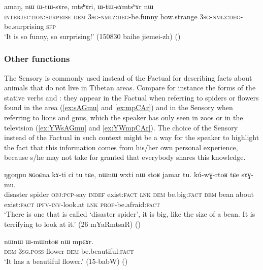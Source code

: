 \begin{exe}
\ex \label{ex:amang.WtWsAre}
 \gll amaŋ, nɯ ɯ-tɯ-sɤre, mtsʰɤri, ɯ-tɯ-sɤmtsʰɤr nɯ \\
 \textsc{interjection}:\textsc{surprise} \textsc{dem} \textsc{3sg}-\textsc{nmlz}:\textsc{deg}-be.funny  how.strange \textsc{3sg}-\textsc{nmlz}:\textsc{deg}-be.surprising \textsc{sfp} \\
 \glt `It is so funny, so surprising!' (150830 baihe jiemei-zh)
()
\end{exe}



\subsubsection{Other functions} \label{sec:sensory.other}
The Sensory is commonly used instead of the Factual for describing facts about animals that do not live in Tibetan areas. Compare for instance the forms of the stative verbs  and : they appear in the Factual when referring to spiders or flowers found in the area (\ref{ex:sAGmu} and \ref{ex:mpCAr}) and in the Sensory when referring to lions and gnus, which the speaker has only seen in zoos or in the television  (\ref{ex:YWsAGmu} and \ref{ex:YWmpCAr}). The choice of the Sensory instead of the Factual in such context might be a way for the speaker to highlight the fact that this information comes from his/her own personal experience, because s/he may not take for granted that everybody shares this knowledge.

 \begin{exe}
\ex \label{ex:sAGmu}
\gll  ŋgoŋpu ɴɢoɕna kɤ-ti ci tu tɕe, nɯnɯ wxti nɯ stoʁ jamar tu. kú-wɣ-rtoʁ tɕe sɤɣ-mu. \\
disaster spider \textsc{obj}:\textsc{pcp}-say \textsc{indef} exist:\textsc{fact} \textsc{lnk} \textsc{dem} be.big:\textsc{fact}  \textsc{dem} bean about exist:\textsc{fact} \textsc{ipfv}-\textsc{inv}-look.at \textsc{lnk} \textsc{prop}-be.afraid:\textsc{fact} \\
\glt `There is one that is  called `disaster spider', it is big, like the size of a bean. It is terrifying to look at it.' (26 mYaRmtsaR)
()
\end{exe}


\begin{exe}
\ex \label{ex:mpCAr}
\gll nɯnɯ ɯ-mɯntoʁ nɯ mpɕɤr. \\
\textsc{dem} \textsc{3sg}.\textsc{poss}-flower \textsc{dem} be.beautiful:\textsc{fact} \\
\glt `It has a beautiful flower.' (15-babW) ()
\end{exe}

